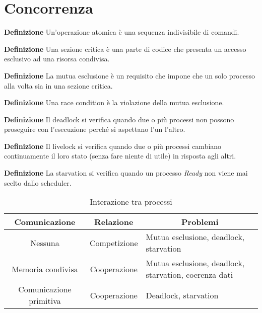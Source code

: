 \documentclass{article}
\begin{document}
\section{Concorrenza}

\textbf{Definizione} Un'operazione atomica è una sequenza indivisibile di comandi.\newline

\noindent\textbf{Definizione} Una sezione critica è una parte di codice che presenta un accesso esclusivo ad una risorsa condivisa.\newline

\noindent\textbf{Definizione} La mutua esclusione è un requisito che impone che un solo processo alla volta sia in una sezione critica.\newline

\noindent\textbf{Definizione} Una race condition è la violazione della mutua esclusione.\newline

\noindent\textbf{Definizione} Il deadlock si verifica quando due o più processi non possono proseguire con l'esecuzione perché si aspettano l'un l'altro.\newline

\noindent\textbf{Definizione} Il livelock si verifica quando due o più processi cambiano continuamente il loro stato (senza fare niente di utile) in risposta agli altri.\newline

\noindent\textbf{Definizione} La starvation si verifica quando un processo \textit{Ready} non viene mai scelto dallo scheduler.\newline

\begin{table}[H]
    \begin{adjustwidth}{-1.5cm}{}
    \begin{tabular}{|c|c|l|}
        \hline
        \textbf{Comunicazione} & \textbf{Relazione} & \multicolumn{1}{|c|}{\textbf{Problemi}}\\
         \hline
        Nessuna & Competizione & Mutua esclusione, deadlock, starvation\\
         \hline
        Memoria condivisa & Cooperazione & Mutua esclusione, deadlock, starvation, coerenza dati\\
         \hline
        Comunicazione primitiva & Cooperazione & Deadlock, starvation\\
         \hline
    \end{tabular}
    \end{adjustwidth}
    \caption{Interazione tra processi}
    \label{tab:conc}
\end{table}
\end{document}
